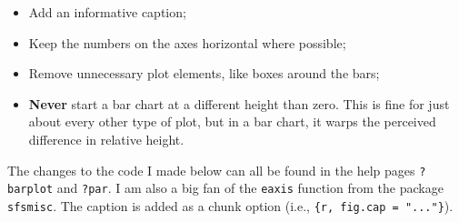 \documentclass[
]{book}
\providecommand{\tightlist}{%
  \setlength{\itemsep}{0pt}\setlength{\parskip}{0pt}}
\begin{document}
\begin{itemize}
\tightlist
\item
  Add an informative caption;
\item
  Keep the numbers on the axes horizontal where possible;
\item
  Remove unnecessary plot elements, like boxes around the bars;
\item
  \textbf{Never} start a bar chart at a different height than zero. This is fine for just about every other type of plot, but in a bar chart, it warps the perceived difference in relative height.
\end{itemize}

The changes to the code I made below can all be found in the help pages \texttt{?barplot} and \texttt{?par}. I am also a big fan of the \texttt{eaxis} function from the package \texttt{sfsmisc}. The caption is added as a chunk option (i.e., \texttt{\textasciigrave{}\textasciigrave{}\textasciigrave{}\{r,\ fig.cap\ =\ "..."\}}).
\end{document}
